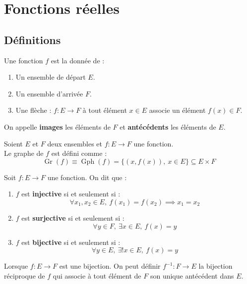 \chapter{Fonctions réelles}
\def\arraystretch{1}

\section{Définitions}
\begin{definition}[Fonction]
	Une fonction $f$ est la donnée de :
	\begin{enumerate}
		\item Un ensemble de départ $E$.
		\item Un ensemble d'arrivée $F$.
		\item Une flèche : $ f : E \to F $ à tout élément $x \in E$ associe un élément $f(x) \in F$.
	\end{enumerate}		
	On appelle \textbf{images} les éléments de $F$ et \textbf{antécédents} les éléments de $E$.
\end{definition}

\begin{definition}
	Soient $E$ et $F$ deux ensembles et $f : E \to F$ une fonction.
	\\
	Le graphe de $f$ est défini comme :
	\[ \operatorname{Gr}(f) \equiv \operatorname{Gph}(f) = \{ (x, f(x)),\ x \in E \} \subseteq E \times F \] 
\end{definition}

\begin{definition}
	Soit $f : E \to F$ une fonction. On dit que :
    \begin{enumerate}
        \item $f$ est \textbf{injective} si et seulement si : 
        \[ \forall x_1, x_2 \in E,\ f(x_1) = f(x_2) \implies x_1 = x_2 \]
        \item $f$ est \textbf{surjective} si et seulement si : 
        \[ \forall y \in F,\ \exists x \in E,\ f(x) = y \]
        \item $f$ est \textbf{bijective} si et seulement si :
        \[ \forall y \in E,\ \exists ! x \in E,\ f(x) = y \]
    \end{enumerate}
\end{definition}

\begin{definition}
	Lorsque $f : E \to F$ est une bijection. On peut définir $f^{-1} : F \to E$ la bijection réciproque de $f$ qui associe à tout élément de $F$ son unique antécédent dans $E$.
\end{definition}

